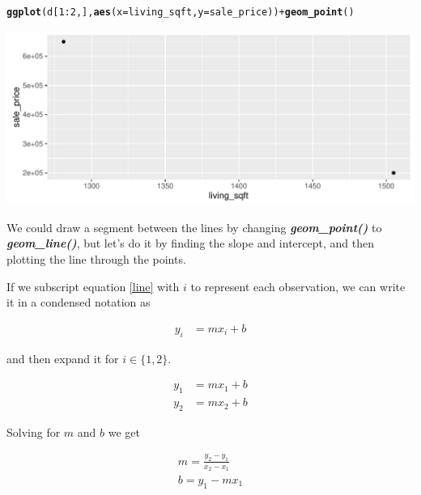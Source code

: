 \documentclass[10pt]{article}\usepackage[]{graphicx}\usepackage[]{color}
\makeatletter
\def\maxwidth{ %
  \ifdim\Gin@nat@width>\linewidth
    \linewidth
  \else
    \Gin@nat@width
  \fi
}
\newcommand{\hlnum}[1]{\textcolor[rgb]{0.686,0.059,0.569}{#1}}%
\newcommand{\hlopt}[1]{\textcolor[rgb]{0,0,0}{#1}}%
\newcommand{\hlstd}[1]{\textcolor[rgb]{0.345,0.345,0.345}{#1}}%
\newcommand{\hlkwc}[1]{\textcolor[rgb]{0.333,0.667,0.333}{#1}}%
\newcommand{\hlkwd}[1]{\textcolor[rgb]{0.737,0.353,0.396}{\textbf{#1}}}%
\newenvironment{kframe}{%
 \def\at@end@of@kframe{}%
 \ifinner\ifhmode%
  \def\at@end@of@kframe{\end{minipage}}%
  \begin{minipage}{\columnwidth}%
 \fi\fi%
 \def\FrameCommand##1{\hskip\@totalleftmargin \hskip-\fboxsep
 \colorbox{shadecolor}{##1}\hskip-\fboxsep
     \hskip-\linewidth \hskip-\@totalleftmargin \hskip\columnwidth}%
 \MakeFramed {\advance\hsize-\width
   \@totalleftmargin\z@ \linewidth\hsize
   \@setminipage}}%
 {\par\unskip\endMakeFramed%
 \at@end@of@kframe}
\newenvironment{knitrout}{}{} %
\newcommand{\code}[1]{\textbf{\textit{#1}}}
\makeatother
\begin{document}
\begin{knitrout}\small
{}\color{fgcolor}\begin{kframe}
\begin{alltt}
\hlkwd{ggplot}\hlstd{(d[}\hlnum{1}\hlopt{:}\hlnum{2}\hlstd{,],}\hlkwd{aes}\hlstd{(}\hlkwc{x}\hlstd{=living_sqft,}\hlkwc{y}\hlstd{=sale_price))} \hlopt{+} \hlkwd{geom_point}\hlstd{()}
\end{alltt}
\end{kframe}

{\centering \includegraphics[width=\maxwidth]{figure/plot2-1} 

}



\end{knitrout}

We could draw a segment between the lines by changing \code{geom\_point()} to \code{geom\_line()}, but let's do it by finding the slope and intercept, and then plotting the line through the points.

If we subscript equation \ref{line} with $i$ to represent each observation, we can write it in a condensed notation as

\begin{align}
y_i &= m x_i + b \label{line_general}
\end{align}

and then expand it for $i \in \{1,2\}$.

\begin{align}
y_1 &= m x_1 + b \\
y_2 &= m x_2 + b
\end{align}

Solving for $m$ and $b$ we get

\begin{align}
m = \frac{y_2 - y_1}{x_2-x_1} \label{solution_slope} \\
b = y_1 - mx_1 \label{solution_intercept}
\end{align}
\end{document}
